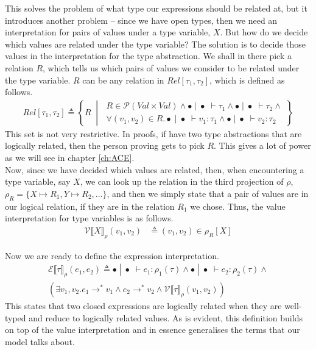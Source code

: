 \documentclass[a4paper, 11pt]{report}
\theoremstyle{definition}
\newcommand{\expr}{e}
\newcommand{\val}{v}
\newcommand{\Tvar}{X}
\newcommand{\TvarB}{Y}
\newcommand{\typ}{\tau}
\newcommand{\emptenv}{\bullet}
\newcommand{\empvenv}{\bullet}
\newcommand{\jdg}[4]{#1 \; | \; #2 \; \vdash #3 : #4}
\newcommand{\jdgType}[3]{#1 \; | \; #2 \; \vdash #3}
\newcommand{\stepS}{\rightarrow^*}
\newcommand{\ValInp}[2]{\mathcal{V} \llbracket #1 \rrbracket_{#2}}
\newcommand{\ValInpGen}[2]{\ValInp{#1}{#2}(\val_1, \val_2)}
\newcommand{\ExpInp}[2]{\mathcal{E} \llbracket #1 \rrbracket_{#2}}
\begin{document}
This solves the problem of what type our expressions should be related at, but it introduces another problem – since we have open types, then we need an interpretation for pairs of values under a type variable, $\Tvar$. But how do we decide which values are related under the type variable? The solution is to decide those values in the interpretation for the type abstraction. We shall in there pick a relation $R$, which tells us which pairs of values we consider to be related under the type variable. $R$ can be any relation in $Rel[\typ_1, \typ_2]$, which is defined as follows.
\begin{align*}
  Rel[\typ_1, \typ_2] \triangleq 
  \left\{R \; \middle\vert \;
  \begin{aligned}
    R \in \mathcal{P}(Val \times Val) \land \jdgType{\emptenv}{\empvenv}{\typ_1} \land \jdgType{\emptenv}{\empvenv}{\typ_2} \land\\ \forall (\val_1, \val_2) \in R . \jdg{\emptenv}{\empvenv}{\val_1}{\typ_1} \land \jdg{\emptenv}{\empvenv}{\val_2}{\typ_2}
  \end{aligned}
  \right\}
\end{align*}
This set is not very restrictive. In proofs, if have two type abstractions that are logically related, then the person proving gets to pick $R$. This gives a lot of power as we will see in chapter \ref{ch:ACE}.\\
Now, since we have decided which values are related, then, when encountering a type variable, say $\Tvar$, we can look up the relation in the third projection of $\rho$, $\rho_R = \{\Tvar \mapsto R_1, \TvarB \mapsto R_2, \dots\}$, and then we simply state that a pair of values are in our logical relation, if they are in the relation $R_1$ we chose. Thus, the value interpretation for type variables is as follows.
\begin{align*}
  \ValInpGen{\Tvar}{\rho} &\triangleq (\val_1, \val_2) \in \rho_R[\Tvar]
\end{align*}

Now we are ready to define the expression interpretation.
\begin{multline*}
  \ExpInp{\typ}{\rho}(\expr_1, \expr_2) \triangleq
    \jdg{\emptenv}{\empvenv}{\expr_1}{\rho_1(\typ)} \land \jdg{\emptenv}{\empvenv}{\expr_2}{\rho_2(\typ)} \land\\
    (\exists \val_1, \val_2 . \expr_1 \stepS \val_1 \land \expr_2 \stepS \val_2 \land\ValInpGen{\typ}{\rho})
\end{multline*}
This states that two closed expressions are logically related when they are well-typed and reduce to logically related values. As is evident, this definition builds on top of the value interpretation and in essence generalises the terms that our model talks about.
\end{document}
